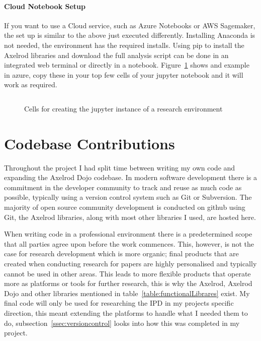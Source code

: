 \paragraph{Cloud Notebook Setup} 
If you want to use a Cloud service, such as Azure Notebooks or AWS Sagemaker, the set up is similar to the above just executed differently.
Installing Anaconda is not needed, the environment has the required installs.
Using pip to install the Axelrod libraries and download the full analysis script can be done in an integrated web terminal or directly in a notebook.
Figure~\ref{code:jupyterExample} shows and example in azure, copy these in your top few cells of your jupyter notebook and it will work as required.

\begin{figure}[ht]
    \inputminted{python}{code_snippets/dev-examples/jupyterCells.py}
    \caption{Cells for creating the jupyter instance of a research environment}\label{code:jupyterExample}
\end{figure}

\section{Codebase Contributions}
Throughout the project I had split time between writing my own code and expanding the Axelrod Dojo codebase. 
In modern software development there is a commitment in the developer community to track and reuse as much code as possible, typically using a version control system such as Git or Subversion.
The majority of open source community development is conducted on github\cite{GitHub} using Git, the Axelrod libraries, along with most other libraries I used, are hosted here.

When writing code in a professional environment there is a predetermined scope that all parties agree upon before the work commences.  This, however, is not the case for research development which is more organic;
final products that are created when conducting research for papers are highly personalised and typically cannot be used in other areas.
This leads to more flexible products that operate more as platforms or tools for further research, this is why the Axelrod, Axelrod Dojo and other libraries mentioned in table~\ref{table:functionalLibrares} exist.
My final code will only be used for researching the IPD in my projects specific direction, this meant extending the platforms to handle what I needed them to do, subsection~\ref{ssec:versioncontrol} looks into how this was completed in my project.

